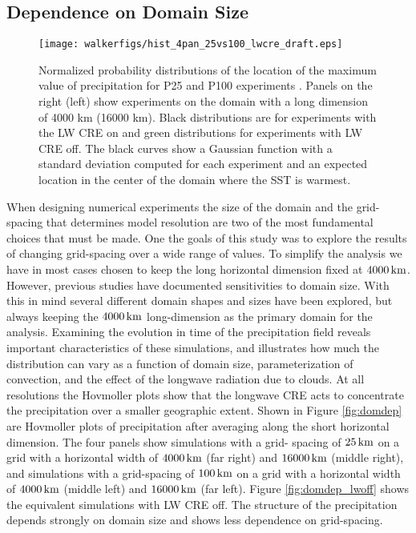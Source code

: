 \documentclass[11pt]{article}   	%
\begin{document}
\subsection{Dependence on Domain Size}


\begin{figure}
  \centering
      \texttt{[image: walkerfigs/hist\_4pan\_25vs100\_lwcre\_draft.eps]}
  \caption{Normalized probability distributions of the location of the maximum value of precipitation for P25 and P100
  experiments .   Panels on the right (left) show experiments on the domain with a long dimension of 4000 km 
  (16000 km).  Black distributions are for experiments with the LW CRE on and green distributions for experiments 
  with LW CRE off.  The black curves show a Gaussian function with a standard deviation computed for 
  each experiment and an expected location in the center of the domain where the SST is warmest.}
\end{figure}


When designing numerical experiments the size of the domain and the grid-spacing that determines model resolution are two of the most 
fundamental choices that must be made.   One the goals of this study was to explore the results of changing grid-spacing over a wide 
range of values.  To simplify the analysis we have in most cases chosen to keep the 
long horizontal dimension fixed at $4000\, \rm{km}$.  However, previous studies have documented sensitivities to domain size.  With this 
in mind several different domain shapes and sizes have been explored, but always keeping the $4000\, \rm{km}$ long-dimension as the 
primary domain for the analysis.  
Examining the evolution in time of the precipitation field reveals important characteristics of these simulations, and 
illustrates how much the distribution can vary as a function of domain size, parameterization of convection, and the effect of the 
longwave radiation due to clouds.  At all resolutions the Hovmoller plots show that the longwave CRE acts to concentrate the 
precipitation over a smaller geographic extent.  
Shown in Figure {\ref{fig:domdep}} are Hovmoller plots of precipitation after 
averaging along the short horizontal dimension.  The four panels show simulations with a grid-
spacing of $25\, \rm{km}$ on a grid with a horizontal width of $4000\, \rm{km}$ (far right) and $16000\, \rm{km}$ (middle right), and 
simulations with a grid-spacing of $100\, \rm{km}$ on a grid with a horizontal width of $4000\, \rm{km}$ (middle left) and 
$16000\, \rm{km}$ (far left).  Figure  {\ref{fig:domdep_lwoff}} shows the equivalent simulations with LW CRE off.    
The structure of the precipitation depends strongly on domain size and shows less dependence on grid-spacing.     
\end{document}
